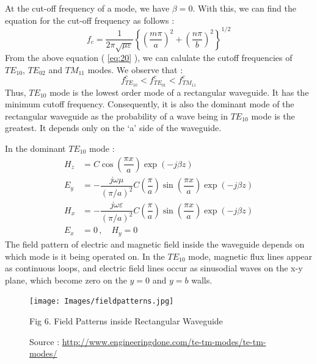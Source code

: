 \documentclass[12pt]{article}
\newcommand*{\myref}[1]{%
  \begingroup
    \hypersetup{
      linkcolor=linkequation,
      linkbordercolor=linkequation,
    }%
    \ref{#1}%
  \endgroup
}
\begin{document}
At the cut-off frequency of a mode, we have $\beta=0$. \linebreak
With this, we can find the equation for the cut-off frequency as follows :
\begin{equation}
  f_c = \dfrac{1}{2\pi \sqrt{\mu \varepsilon}} \left\{ \left( \dfrac{m\pi}{a} \right)^2+\left( \dfrac{n\pi}{b} \right)^2 \right\}^{1/2} \label{eq:20}
\end{equation}
From the above equation (\myref{eq:20}), we can calulate the cutoff frequencies of $TE_{10}$, $TE_{02}$ and $TM_{11}$ modes. We observe that :
\begin{equation*}
  f^c_{TE_{10}} < f^c_{TE_{01}} < f^c_{TM_{11}}
\end{equation*}
Thus, $TE_{10}$ mode is the lowest order mode of a rectangular waveguide. It has the minimum cutoff frequency. Consequently, it is also the dominant mode of the rectangular waveguide as the probability of a wave being in $TE_{10}$ mode is the greatest. It depends only on the `a' side of the waveguide. \linebreak

In the dominant $TE_{10}$ mode :
\begin{align*}
  H_z &= C \cos\left( \dfrac{\pi x}{a} \right)\exp(-j\beta z) \\
  E_y &= -\dfrac{j \omega \mu}{\left( \pi/a \right)^2}C \left( \dfrac{\pi}{a} \right)\sin\left( \dfrac{\pi x}{a} \right)\exp(-j\beta z) \\
  H_x &= - \dfrac{j \omega \varepsilon}{\left( \pi/a \right)^2}C\left( \dfrac{\pi}{a} \right)\sin\left( \dfrac{\pi x}{a} \right) \exp(-j\beta z) \\
  E_x &= 0 \, , \quad H_y =0
\end{align*}
The field pattern of electric and magnetic field inside the waveguide depends on which mode is it being operated on. \linebreak
In the $TE_{10}$ mode, magnetic flux lines appear as continuous loops, and electric field lines occur as sinusodial waves on the x-y plane, which become zero on the $y=0$ and $y=b$ walls.
\begin{figure}[H]
  \centering
  \texttt{[image: Images/fieldpatterns.jpg]}
  \caption{Fig 6. Field Patterns inside Rectangular Waveguide}
  \caption{\tiny Source : \url{http://www.engineeringdone.com/te-tm-modes/te-tm-modes/}}
\end{figure}
\end{document}
